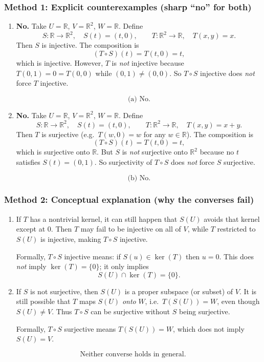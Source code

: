 \documentclass[12pt]{article}
\newcommand{\R}{\mathbb{R}}
\begin{document}
\subsubsection{Method 1: Explicit counterexamples (sharp ``no'' for both)}
\begin{enumerate}[label=(\alph*)]
\item \textbf{No.} Take $U=\R$, $V=\R^2$, $W=\R$. Define
\[
S:\R\to\R^2,\quad S(t)=(t,0),
\qquad
T:\R^2\to\R,\quad T(x,y)=x.
\]
Then $S$ is injective. The composition is
\[
(T\circ S)(t)=T(t,0)=t,
\]
which is injective. However, $T$ is \emph{not} injective because $T(0,1)=0=T(0,0)$ while $(0,1)\neq(0,0)$.
So $T\circ S$ injective does \emph{not} force $T$ injective.

\[
\boxed{\,\text{(a) No.}\,}
\]

\item \textbf{No.} Take $U=\R$, $V=\R^2$, $W=\R$. Define
\[
S:\R\to\R^2,\quad S(t)=(t,0),
\qquad
T:\R^2\to\R,\quad T(x,y)=x+y.
\]
Then $T$ is surjective (e.g.\ $T(w,0)=w$ for any $w\in\R$). The composition is
\[
(T\circ S)(t)=T(t,0)=t,
\]
which is surjective onto $\R$. But $S$ is \emph{not} surjective onto $\R^2$ because no $t$ satisfies $S(t)=(0,1)$.
So surjectivity of $T\circ S$ does \emph{not} force $S$ surjective.

\[
\boxed{\,\text{(b) No.}\,}
\]
\end{enumerate}
\newpage
\subsubsection{Method 2: Conceptual explanation (why the converses fail)}
\begin{enumerate}[label=(\alph*)]
\item If $T$ has a nontrivial kernel, it can still happen that $S(U)$ avoids that kernel except at $0$.
Then $T$ may fail to be injective on all of $V$, while $T$ restricted to $S(U)$ is injective, making $T\circ S$ injective.

Formally, $T\circ S$ injective means: if $S(u)\in \ker(T)$ then $u=0$.
This does \emph{not} imply $\ker(T)=\{0\}$; it only implies
\[
S(U)\cap \ker(T)=\{0\}.
\]

\item If $S$ is not surjective, then $S(U)$ is a proper subspace (or subset) of $V$.
It is still possible that $T$ maps $S(U)$ \emph{onto} $W$, i.e.\ $T(S(U))=W$, even though $S(U)\neq V$.
Thus $T\circ S$ can be surjective without $S$ being surjective.

Formally, $T\circ S$ surjective means $T(S(U))=W$, which does not imply $S(U)=V$.
\end{enumerate}

\[
\boxed{\,\text{Neither converse holds in general.}\,}
\]
\end{document}
